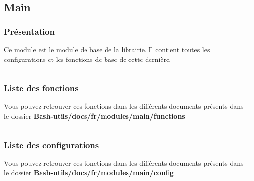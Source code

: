 \documentclass[a4paper,10pt]{article}
\begin{document}
\color{green}
\subsection{Main}\color{white}

\color{blue}
\subsubsection{Présentation}\color{white}

\begin{justify}
    Ce module est le module de base de la librairie. Il contient toutes les configurations et les fonctions de base de cette dernière.
\end{justify}



\color{blue}\par\noindent\rule{\textwidth}{0.4pt}\color{white}

\color{blue}
\subsubsection{Liste des fonctions}\color{white}

\begin{justify}
    Vous pouvez retrouver ces fonctions dans les différents documents présents dans le dossier \textbf{\color{lime}Bash-utils/docs/fr/modules/main/functions\color{white}}
\end{justify}


\color{blue}\par\noindent\rule{\textwidth}{0.4pt}\color{white}

\color{blue}
\subsubsection{Liste des configurations}\color{white}

\begin{justify}
    Vous pouvez retrouver ces fonctions dans les différents documents présents dans le dossier \textbf{\color{lime}Bash-utils/docs/fr/modules/main/config\color{white}}
\end{justify}
\end{document}
